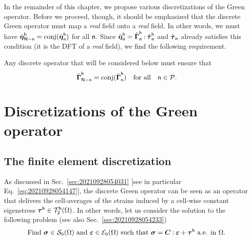 \begin{remark}
  \label{rem:20210928060531}
  In the remainder of this chapter, we propose various discretizations of the
  Green operator. Before we proceed, though, it should be emphasized that the
  discrete Green operator must map a \emph{real} field onto a \emph{real}
  field. In other words, we must have
  \(\hat{\boldsymbol\eta}_{\mathsf N-\mathsf n}^{\mathsf h}=\operatorname{conj}(\hat{\boldsymbol\eta}_{\mathsf
    n}^{\mathsf h})\) for all \(\mathsf n\). Since
  \(\hat{\boldsymbol\eta}_{\mathsf n}^{\mathsf h} =\hat{\boldsymbol\Gamma}_{\mathsf n}^{\mathsf
    h}\mathbin{\mathord{:}}\hat{\boldsymbol\tau}_{\mathsf n}^{\mathsf h}\) and
  \(\hat{\boldsymbol\tau}_{\mathsf n}\) already satisfies this condition (it is the DFT
  of a \emph{real} field), we find the following requirement.

  Any discrete operator that will be considered below must ensure that
  \begin{equation}
    \hat{\boldsymbol\Gamma}_{\mathsf N-\mathsf n}^{\mathsf h}
    =\operatorname{conj}(\hat{\boldsymbol\Gamma}_{\mathsf n}^{\mathsf h})
    \quad\text{for all}\quad\mathsf n\in\mathcal{P}.
  \end{equation}
\end{remark}


\section{Discretizations of the Green operator}

\subsection{The finite element discretization}

As discussed in Sec.~\ref{sec:20210928054031} [see in particular
Eq.~\eqref{eq:20210928054147}], the discrete Green operator can be seen as an
operator that delivers the cell-averages of the strains induced by a cell-wise
constant eigenstress \(\boldsymbol\tau^\mathsf{h}\in\mathcal T_2^\mathsf{h}(\Omega)\). In
other words, let us consider the solution to the following problem (see also
Sec.~\ref{sec:20210928054233})
\begin{equation}
  \label{eq:20210914140834}
  \text{Find }\boldsymbol\sigma\in\mathcal S_0(\Omega)
  \text{ and }\boldsymbol\varepsilon\in\mathcal E_0(\Omega)
  \text{ such that }\boldsymbol\sigma=\boldsymbol C\mathbin{\mathord{:}}\boldsymbol\varepsilon+\boldsymbol\tau^\mathsf{h}
  \text{ a.e. in }\Omega.
\end{equation}

